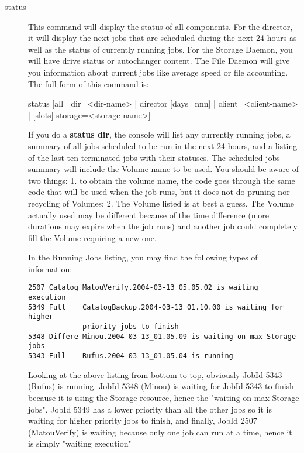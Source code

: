 \begin{description}
\item [status]

   This command will display the status of all components. For the director, it
   will display the next jobs that are scheduled during the next 24 hours as
   well as the status of currently running jobs. For the Storage Daemon, you
   will have drive status or autochanger content. The File Daemon will give you
   information about current jobs like average speed or file accounting. The
   full form of this command is:

status [all | dir={\textless}dir-name{\textgreater} | director [days=nnn] |
  client={\textless}client-name{\textgreater} | [slots] storage={\textless}storage-name{\textgreater}]

   If you do a {\bf status dir}, the console will list any currently
   running jobs, a summary of all jobs scheduled to be run in the next 24
   hours, and a listing of the last ten terminated jobs with their statuses.
   The scheduled jobs summary will include the Volume name to be used.  You
   should be aware of two things: 1. to obtain the volume name, the code
   goes through the same code that will be used when the job runs, but it
   does not do pruning nor recycling of Volumes; 2.  The Volume listed is
   at best a guess.  The Volume actually used may be different because of
   the time difference (more durations may expire when the job runs) and
   another job could completely fill the Volume requiring a new one.

   In the Running Jobs listing, you may find the following types of
   information:


\footnotesize
\begin{verbatim}
2507 Catalog MatouVerify.2004-03-13_05.05.02 is waiting execution
5349 Full    CatalogBackup.2004-03-13_01.10.00 is waiting for higher
             priority jobs to finish
5348 Differe Minou.2004-03-13_01.05.09 is waiting on max Storage jobs
5343 Full    Rufus.2004-03-13_01.05.04 is running
\end{verbatim}
\normalsize

   Looking at the above listing from bottom to top, obviously JobId 5343
   (Rufus) is running.  JobId 5348 (Minou) is waiting for JobId 5343 to
   finish because it is using the Storage resource, hence the "waiting on
   max Storage jobs".  JobId 5349 has a lower priority than all the other
   jobs so it is waiting for higher priority jobs to finish, and finally,
   JobId 2507 (MatouVerify) is waiting because only one job can run at a
   time, hence it is simply "waiting execution"


\end{description}
